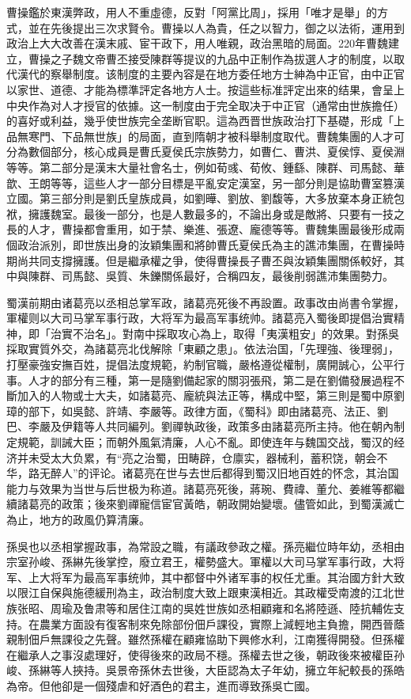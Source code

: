 曹操鑑於東漢弊政，用人不重虛德，反對「阿黨比周」，採用「唯才是舉」的方式，並在先後提出三次求賢令。曹操以人為貴，任之以智力，御之以法術，運用到政治上大大改善在漢末戚、宦干政下，用人唯親，政治黑暗的局面。220年曹魏建立，曹操之子魏文帝曹丕接受陳群等提议的九品中正制作為拔選人才的制度，以取代漢代的察舉制度。该制度的主要內容是在地方委任地方士紳為中正官，由中正官以家世、道德、才能為標準評定各地方人士。按這些标准評定出來的结果，會呈上中央作為对人才授官的依據。这一制度由于完全取决于中正官（通常由世族擔任）的喜好或利益，幾乎使世族完全垄断官职。這為西晋世族政治打下基礎，形成「上品無寒門、下品無世族」的局面，直到隋朝才被科舉制度取代。曹魏集團的人才可分為數個部分，核心成員是曹氏夏侯氏宗族勢力，如曹仁、曹洪、夏侯惇、夏侯淵等等。第二部分是漢末大量社會名士，例如荀彧、荀攸、鍾繇、陳群、司馬懿、華歆、王朗等等，這些人才一部分目標是平亂安定漢室，另一部分則是協助曹室篡漢立國。第三部分則是劉氏皇族成員，如劉曄、劉放、劉馥等，大多放棄本身正統包袱，擁護魏室。最後一部分，也是人數最多的，不論出身或是敵將、只要有一技之長的人才，曹操都會重用，如于禁、樂進、張遼、龐德等等。曹魏集團最後形成兩個政治派別，即世族出身的汝穎集團和將帥曹氏夏侯氏為主的譙沛集團，在曹操時期尚共同支撐擁護。但是繼承權之爭，使得曹操長子曹丕與汝穎集團關係較好，其中與陳群、司馬懿、吳質、朱鑠關係最好，合稱四友，最後削弱譙沛集團勢力。

蜀漢前期由诸葛亮以丞相总掌军政，諸葛亮死後不再設置。政事改由尚書令掌握，軍權则以大司马掌军事行政，大将军为最高军事统帅。諸葛亮入蜀後即提倡治實精神，即「治實不治名」。對南中採取攻心為上，取得「夷漢粗安」的效果。對孫吳採取實質外交，為諸葛亮北伐解除「東顧之患」。依法治国，「先理強、後理弱」，打壓豪強安撫百姓，提倡法度規範，約制官職，嚴格遵從權制，廣開誠心，公平行事。人才的部分有三種，第一是隨劉備起家的關羽張飛，第二是在劉備發展過程不斷加入的人物或士大夫，如諸葛亮、龐統與法正等，構成中堅，第三則是蜀中原劉璋的部下，如吳懿、許靖、李嚴等。政律方面，《蜀科》即由諸葛亮、法正、劉巴、李嚴及伊籍等人共同編列。劉禪執政後，政策多由諸葛亮所主持。他在朝內制定規範，訓誡大臣；而朝外風氣清廉，人心不亂。即使连年与魏国交战，蜀汉的经济并未受太大负累，有“亮之治蜀，田畴辟，仓廪实，器械利，蓄积饶，朝会不华，路无醉人”的评论。诸葛亮在世与去世后都得到蜀汉旧地百姓的怀念，其治国能力与效果为当世与后世极为称道。諸葛亮死後，蔣琬、費禕、董允、姜維等都繼續諸葛亮的政策；後來劉禪寵信宦官黃皓，朝政開始變壞。儘管如此，到蜀漢滅亡為止，地方的政風仍算清廉。

孫吳也以丞相掌握政事，為常設之職，有議政參政之權。孫亮繼位時年幼，丞相由宗室孙峻、孫綝先後掌控，廢立君王，權勢盛大。軍權以大司马掌军事行政，大将军、上大将军为最高军事统帅，其中都督中外诸军事的权任尤重。其治國方針大致以限江自保與施德緩刑為主，政治制度大致上跟東漢相近。其政權受南渡的江北世族张昭、周瑜及鲁肃等和居住江南的吳姓世族如丞相顧雍和名將陸遜、陸抗輔佐支持。在農業方面設有復客制來免除部份佃戶課役，實際上減輕地主負擔，開西晉蔭親制佃戶無課役之先聲。雖然孫權在顧雍協助下興修水利，江南獲得開發。但孫權在繼承人之事沒處理好，使得後來的政局不穩。孫權去世之後，朝政後來被權臣孙峻、孫綝等人挾持。吳景帝孫休去世後，大臣認為太子年幼，擁立年紀較長的孫皓為帝。但他卻是一個殘虐和好酒色的君主，進而導致孫吳亡國。

